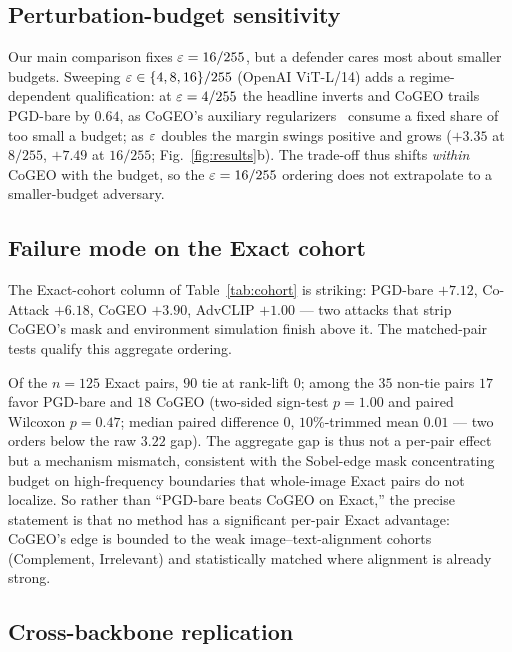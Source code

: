 \subsection{Perturbation-budget sensitivity}
\label{sec:analysis:eps}

Our main comparison fixes $\varepsilon = 16/255$, but a defender cares most about smaller budgets. Sweeping $\varepsilon \in \{4, 8, 16\}/255$ (OpenAI ViT-L/14) adds a regime-dependent qualification: at $\varepsilon = 4/255$ the headline inverts and CoGEO trails PGD-bare by $0.64$, as CoGEO's auxiliary regularizers~\cite{shin2017diffjpeg,xie2019dim,lin2020sim} consume a fixed share of too small a budget; as $\varepsilon$ doubles the margin swings positive and grows ($+3.35$ at $8/255$, $+7.49$ at $16/255$; Fig.~\ref{fig:results}b). The trade-off thus shifts \emph{within} CoGEO with the budget, so the $\varepsilon=16/255$ ordering does not extrapolate to a smaller-budget adversary.

\subsection{Failure mode on the Exact cohort}
\label{sec:analysis:exact}

The Exact-cohort column of Table~\ref{tab:cohort} is striking: PGD-bare $+7.12$, Co-Attack $+6.18$, CoGEO $+3.90$, AdvCLIP $+1.00$ --- two attacks that strip CoGEO's mask and environment simulation finish above it. The matched-pair tests qualify this aggregate ordering.

Of the $n{=}125$ Exact pairs, $90$ tie at rank-lift $0$; among the $35$ non-tie pairs $17$ favor PGD-bare and $18$ CoGEO (two-sided sign-test $p{=}1.00$ and paired Wilcoxon $p{=}0.47$; median paired difference $0$, $10\%$-trimmed mean $0.01$ --- two orders below the raw $3.22$ gap). The aggregate gap is thus not a per-pair effect but a mechanism mismatch, consistent with the Sobel-edge mask concentrating budget on high-frequency boundaries that whole-image Exact pairs do not localize. So rather than ``PGD-bare beats CoGEO on Exact,'' the precise statement is that no method has a significant per-pair Exact advantage: CoGEO's edge is bounded to the weak image--text-alignment cohorts (Complement, Irrelevant) and statistically matched where alignment is already strong.

\subsection{Cross-backbone replication}
\label{sec:analysis:cross-backbone}

